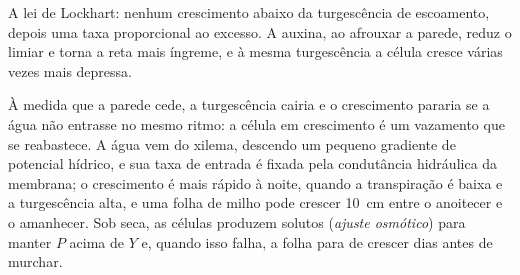 \begin{omfigure}

{\small A lei de Lockhart: nenhum crescimento abaixo da turgescência de
escoamento, depois uma taxa proporcional ao excesso. A auxina, ao
afrouxar a parede, reduz o limiar e torna a reta mais íngreme, e à
mesma turgescência a célula cresce várias vezes mais depressa.}
\end{omfigure}

\begin{example}\label{ex:b2:plant-meristems:water}
À medida que a parede cede, a turgescência cairia e o crescimento
pararia se a água não entrasse no mesmo ritmo: a célula em crescimento
é um vazamento que se reabastece. A água vem do xilema, descendo um
pequeno gradiente de potencial hídrico, e sua taxa de entrada é fixada
pela condutância hidráulica da membrana; o crescimento é mais rápido à
noite, quando a transpiração é baixa e a turgescência alta, e uma folha
de milho pode crescer \qty{10}{cm} entre o anoitecer e o amanhecer. Sob
seca, as células produzem solutos (\emph{ajuste osmótico}) para manter
$P$ acima de $Y$ e, quando isso falha, a folha para de crescer dias
antes de murchar.
\end{example}

